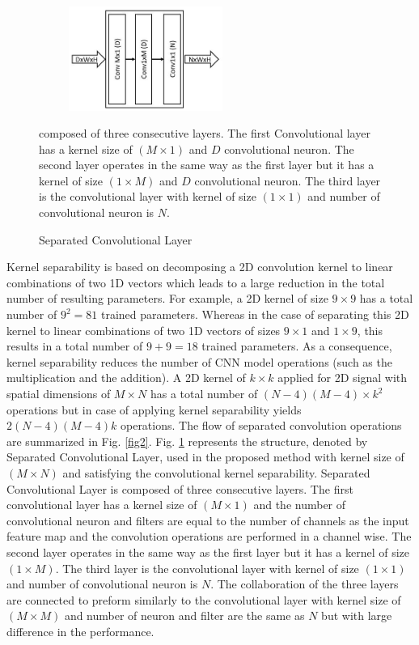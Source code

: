 \begin{figure}
\begin{center}
\includegraphics[height=34mm,width=7.0cm]{Figures/fig3.jpg}
\caption{Separated Convolutional Layer}{ composed of three consecutive layers. The first Convolutional layer has a kernel size of $(M\times1)$ and $D$  convolutional neuron. The second layer  operates in the same way as the first layer but it has a kernel of size $(1\times M)$ and $D$ convolutional neuron. The third layer is the convolutional layer with kernel of size $(1\times1)$ and number of convolutional neuron is $N$.}
\label{fig3}
\end{center}
\end{figure}
    
Kernel separability\cite{rigamonti2013learning} \cite{szegedy2017inception} is based on decomposing a 2D convolution kernel to linear combinations of two 1D vectors which leads to a large reduction in  the total number of resulting parameters. For example, a 2D kernel of size $9 \times 9$ has a total number of $9^2 = 81$  trained parameters. Whereas in the case of separating this 2D kernel to  linear combinations of two 1D vectors of sizes $9 \times 1$ and $1 \times 9$, this results in a total number of  $9 + 9 = 18$ trained parameters. As a consequence, kernel separability reduces the number of CNN model operations (such as the multiplication and the addition). A  2D kernel of $k \times k$ applied for 2D signal with spatial dimensions of $ M \times N$ has a total number of  $(N-4)(M-4)\times k^2$ operations but in case of  applying kernel separability  yields $2(N-4)(M-4)k$ operations. The flow of separated convolution operations are summarized in Fig. \ref{fig2}. Fig. \ref{fig3} represents the structure, denoted by Separated Convolutional Layer, used in the proposed method with kernel size of $(M\times N)$ and satisfying the convolutional kernel separability. Separated Convolutional Layer is composed of three consecutive layers. The first convolutional layer has a kernel size of $(M\times1)$ and the number of convolutional neuron and  filters are equal to the number of channels as the input feature map and the convolution operations are performed in a channel wise. The second layer  operates in the same way as the first layer but it has a kernel of size $(1\times M)$. The third layer is the convolutional layer with kernel of size $(1\times1)$ and number of convolutional neuron is $N$. The collaboration of the three layers are  connected to preform similarly to the convolutional layer with kernel size of $(M\times M)$ and number of neuron and filter are the same as $N$ but with large difference in the performance.



